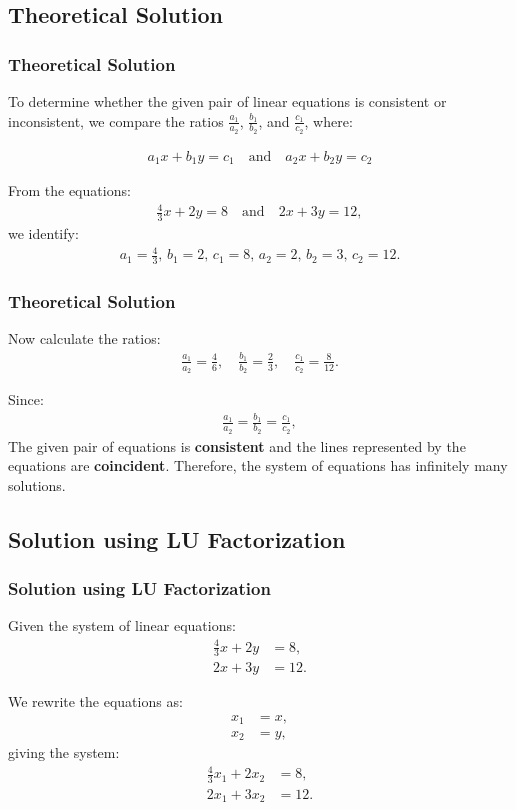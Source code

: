 \documentclass{beamer}
\theoremstyle{remark}
\numberwithin{equation}{section}
\begin{document}
\subsection{Theoretical Solution}
\begin{frame}
\frametitle{Theoretical Solution}
To determine whether the given pair of linear equations is consistent or inconsistent, we compare the ratios $\frac{a_1}{a_2}$, $\frac{b_1}{b_2}$, and $\frac{c_1}{c_2}$, where:
	
	\begin{align}
		a_1x + b_1y = c_1 \quad \text{and} \quad a_2x + b_2y = c_2
	\end{align}
	
	From the equations:
	\begin{align}
		\frac{4}{3}x + 2y = 8 \quad \text{and} \quad  2x + 3y = 12,
	\end{align}
	we identify:
	\begin{align}
		a_1 = \frac{4}{3}, \, b_1 = 2, \, c_1 = 8, \, a_2 = 2, \, b_2 = 3, \, c_2 = 12.
	\end{align}
	
	

\end{frame}
\begin{frame}
\frametitle{Theoretical Solution}
Now calculate the ratios:
	\begin{align}
		\frac{a_1}{a_2} = \frac{4}{6}, \quad \frac{b_1}{b_2} = \frac{2}{3}, \quad \frac{c_1}{c_2} = \frac{8}{12}.
	\end{align}
	
	Since:
	\begin{align}
		\frac{a_1}{a_2} = \frac{b_1}{b_2}=\frac{c_1}{c_2},
	\end{align}
	The given pair of equations is \textbf{consistent} and the lines represented by the equations are \textbf{coincident}. Therefore, the system of equations has infinitely many solutions.
\end{frame}
\subsection{Solution using LU Factorization}
\begin{frame}
\frametitle{Solution using LU Factorization}

Given the system of linear equations:
	\begin{align}
		\frac{4}{3}x + 2y &= 8, \label{eq1} \\
		2x + 3y &= 12. \label{eq2}
	\end{align}
	
	We rewrite the equations as:
	\begin{align}
		x_1 &= x, \\
		x_2 &= y,
	\end{align}
	giving the system:
	\begin{align}
		\frac{4}{3}x_1 + 2x_2 &= 8, \label{eq3} \\
		2x_1 + 3x_2 &= 12. \label{eq4}
	\end{align}
	

\end{frame}
\end{document}
